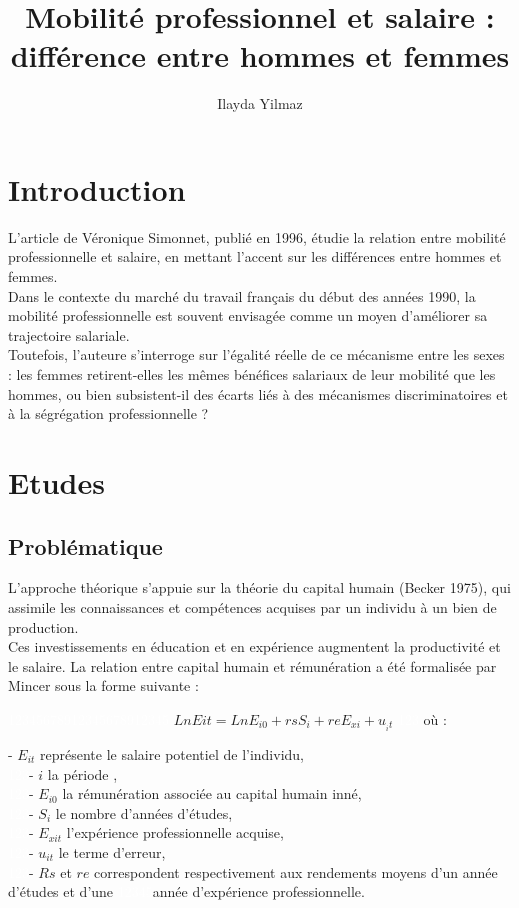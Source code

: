 \documentclass{article}
\title{Mobilité professionnel et salaire : différence entre hommes et femmes}
\author{Ilayda Yilmaz}
\begin{document}
\maketitle

\section{Introduction}

L’article de Véronique Simonnet, publié en 1996, étudie la relation entre mobilité professionnelle et salaire, en mettant l’accent sur les différences entre hommes et femmes. \\
Dans le contexte du marché du travail français du début des années 1990, la mobilité professionnelle est souvent envisagée comme un moyen d’améliorer sa trajectoire salariale.\\
Toutefois, l’auteure s’interroge sur l’égalité réelle de ce mécanisme entre les sexes : les femmes retirent-elles les mêmes bénéfices salariaux de leur mobilité que les hommes, ou bien subsistent-il des écarts liés à des mécanismes discriminatoires et à la ségrégation professionnelle ?

\section{Etudes}

\subsection{Problématique}

L’approche théorique s’appuie sur la théorie du capital humain (Becker 1975), qui assimile les connaissances et compétences acquises par un individu à un bien de production.\\
Ces investissements en éducation et en expérience augmentent la productivité et le salaire. La relation entre capital humain et rémunération a été formalisée par Mincer sous la forme suivante :

\vspace{5pt}

\textcolor{white}{12345678912345678912345}
$Ln E{it} = Ln E_{i0} + rsS_i + reE_{xi} + u_{_it} $  
\textcolor{white}{123}  où :

\vspace{5pt}

 - $E_{it}$  représente le salaire potentiel de l’individu, \\
 \textcolor{white}{123}- $i$ la période ,\\
\textcolor{white}{123}- $E_{i0}$  la rémunération associée au capital humain inné, \\
 \textcolor{white}{123}- $S_i$  le nombre d’années d’études, \\
 \textcolor{white}{123}- $E_{xit}$  l’expérience professionnelle acquise,\\
 \textcolor{white}{123}- $u_{it}$  le terme d’erreur, \\
 \textcolor{white}{123}- $Rs$ et $re$ correspondent respectivement aux rendements moyens d’un année d’études et d’une  \textcolor{white}{12345}année d’expérience professionnelle.\\
\end{document}
